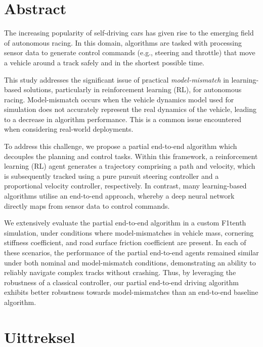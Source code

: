 \chapter{Abstract}%


The increasing popularity of self-driving cars has given rise to the emerging field of autonomous racing.
In this domain, algorithms are tasked with processing sensor data to generate control commands (e.g., steering and throttle) that move a vehicle around a track safely and in the shortest possible time.

This study addresses the significant issue of practical \emph{model-mismatch} in learning-based solutions, particularly in reinforcement learning (RL), for autonomous racing. 
Model-mismatch occurs when the vehicle dynamics model used for simulation does not accurately represent the real dynamics of the vehicle, leading to a decrease in algorithm performance.
This is a common issue encountered when considering real-world deployments.

To address this challenge, we propose a partial end-to-end algorithm which decouples the planning and control tasks. 
Within this framework, a reinforcement learning (RL) agent generates a trajectory comprising a path and velocity, which is subsequently tracked using a pure pursuit steering controller and a proportional velocity controller, respectively.
In contrast, many learning-based algorithms utilise an end-to-end approach, whereby a deep neural network directly maps from sensor data to control commands.

We extensively evaluate the partial end-to-end algorithm in a custom F1tenth simulation, under conditions where model-mismatches in vehicle mass, cornering stiffness coefficient, and road surface friction coefficient are present. 
In each of these scenarios, the performance of the partial end-to-end agents remained similar under both nominal and model-mismatch conditions, demonstrating an ability to reliably navigate complex tracks without crashing. 
Thus, by leveraging the robustness of a classical controller, our partial end-to-end driving algorithm exhibits better robustness towards model-mismatches than an end-to-end baseline algorithm.



\chapter{Uittreksel}%

